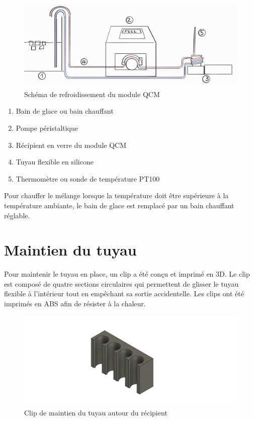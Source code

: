 \begin{figure}[H]
    \centering
    \includegraphics[width=\textwidth]{assets/figures/Pump TB.png}
    \caption{Schéma de refroidissement du module QCM}
    \label{fig:Shema_glacière}
\end{figure}

\begin{enumerate}
    \item Bain de glace ou bain chauffant
    \item Pompe péristaltique
    \item Récipient en verre du module QCM
    \item Tuyau flexible en silicone
    \item Thermomètre ou sonde de température PT100
\end{enumerate}

Pour chauffer le mélange lorsque la température doit être supérieure à la température ambiante, le bain de glace est remplacé par un bain chauffant réglable.

\section{Maintien du tuyau}

Pour maintenir le tuyau en place, un clip a été conçu et imprimé en 3D.  
Le clip est composé de quatre sections circulaires qui permettent de glisser le tuyau flexible à l’intérieur tout en empêchant sa sortie accidentelle.  
Les clips ont été imprimés en ABS afin de résister à la chaleur.

\begin{figure}[H]
    \centering
    \includegraphics[width=\textwidth]{assets/figures/ATACHE TUBE V2.png}
    \caption{Clip de maintien du tuyau autour du récipient}
    \label{fig:Clip_tuyau}
\end{figure}

